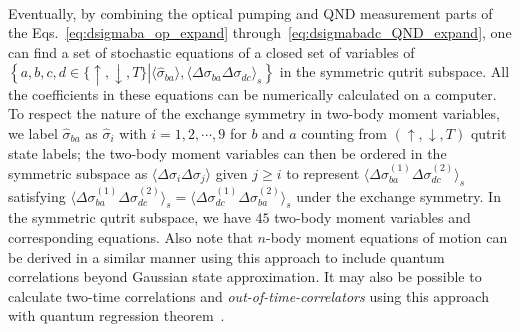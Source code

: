 \documentclass[aps,pra,twocolumn,superscriptaddress]{revtex4-1} %
\newcommand{\expect}[1]{\big\langle #1 \big\rangle}
\begin{document}
\begin{appendix}
\begin{align}
\end{align}
Eventually, by combining the optical pumping and QND measurement parts of the Eqs.~\eqref{eq:dsigmaba_op_expand} through~\eqref{eq:dsigmabadc_QND_expand}, one can find a set of stochastic equations of a closed set of variables of $ \left\{a,b,c,d\in \{\uparrow,\downarrow,T \}\left|\expect{\hat{\sigma}_{ba}},\expect{\Delta\sigma_{ba}\Delta\sigma_{dc} }_s\right. \right\} $ in the symmetric qutrit subspace. All the coefficients in these equations can be numerically calculated on a computer. To respect the nature of the exchange symmetry in two-body moment variables, we label $ \hat{\sigma}_{ba} $ as $ \hat{\sigma}_i $ with $ i=1,2,\cdots, 9 $ for $ b$ and $a  $ counting from $ (\uparrow,\downarrow,T) $ qutrit state labels; the two-body moment variables can then be ordered in the symmetric subspace as $ \expect{\Delta\sigma_i\Delta\sigma_j} $ given $ j\ge i $ to represent $ \expect{\!\Delta \sigma_{ba}^{(\!1\!)}\! \Delta \sigma_{dc}^{(\!2\!)}}_s $ satisfying $ \expect{\!\Delta \sigma_{ba}^{(\!1\!)}\! \Delta \sigma_{dc}^{(\!2\!)}}_s=\expect{\!\Delta \sigma_{dc}^{(\!1\!)}\! \Delta \sigma_{ba}^{(\!2\!)}}_s $ under the exchange symmetry. In the symmetric qutrit subspace, we have $ 45 $ two-body moment variables and corresponding equations. Also note that $ n $-body moment equations of motion can be derived in a similar manner using this approach to include quantum correlations beyond Gaussian state approximation. It may also be possible to calculate two-time correlations and \textit{out-of-time-correlators} using this approach with quantum regression theorem~\cite{Swingle2016Measuring,Swain1981Master}.


\end{appendix}
\end{document}
